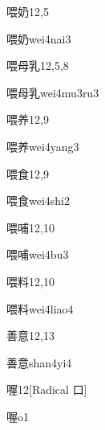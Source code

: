 \begin{entry}{喂奶}{12,5}
  \begin{phonetics}{喂奶}{wei4nai3}
  \end{phonetics}
\end{entry}

\begin{entry}{喂母乳}{12,5,8}
  \begin{phonetics}{喂母乳}{wei4mu3ru3}
  \end{phonetics}
\end{entry}

\begin{entry}{喂养}{12,9}
  \begin{phonetics}{喂养}{wei4yang3}
  \end{phonetics}
\end{entry}

\begin{entry}{喂食}{12,9}
  \begin{phonetics}{喂食}{wei4shi2}
  \end{phonetics}
\end{entry}

\begin{entry}{喂哺}{12,10}
  \begin{phonetics}{喂哺}{wei4bu3}
  \end{phonetics}
\end{entry}

\begin{entry}{喂料}{12,10}
  \begin{phonetics}{喂料}{wei4liao4}
  \end{phonetics}
\end{entry}

\begin{entry}{善意}{12,13}
  \begin{phonetics}{善意}{shan4yi4}
  \end{phonetics}
\end{entry}

\begin{entry}{喔}{12}[Radical 口]
  \begin{phonetics}{喔}{o1}
  \end{phonetics}
\end{entry}

